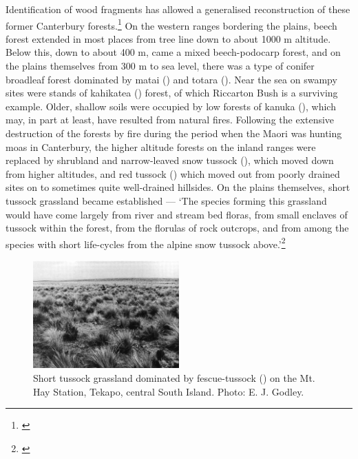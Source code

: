 Identification of wood fragments has allowed a generalised reconstruction of these former Canterbury forests.\footnote{\cite{molloy1969recent}}
On the western ranges bordering the plains, beech forest extended in most places from tree line down to about 1000 m altitude.
Below this, down to about 400 m, came a mixed beech-podocarp forest, and on the plains themselves from 300 m to sea level, there was a type of conifer broadleaf forest dominated by matai () and totara ().
Near the sea on swampy sites were stands of kahikatea () forest, of which Riccarton Bush is a surviving example.
Older, shallow soils were occupied by low forests of kanuka (), which may, in part at least, have resulted from natural fires.
Following the extensive destruction of the forests by fire during the period when the Maori was hunting moas in Canterbury, the higher altitude forests on the inland ranges were replaced by shrubland and narrow-leaved snow tussock (), which moved down from higher altitudes, and red tussock () which moved out from poorly drained sites on to sometimes quite well-drained hillsides.
On the plains themselves, short tussock grassland became established --- `The species forming this grassland would have come largely from river and stream bed floras, from small enclaves of tussock within the forest, from the florulas of rock outcrops, and from among the species with short life-cycles from the alpine snow tussock above.'\footnote{\cite{connor1969montane}}

\begin{figure}
	\includegraphics[width=0.5\textwidth]{graphics/figure81short-tussock.jpg}
	\centering
	\caption[Short tussock grassland dominated by fescue-tussock]{Short tussock grassland dominated by fescue-tussock () on the Mt.
	Hay Station, Tekapo, central South Island.
	Photo:  E. J. Godley.}%
	\label{fig:81short-tussock}
\end{figure}

